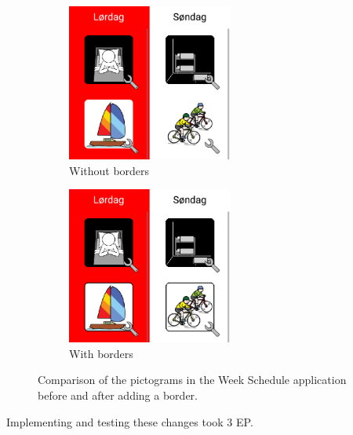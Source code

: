 \begin{figure}[h]
    \centering
        \begin{subfigure}[t]{0.5\textwidth}
        \centering
        \includegraphics[width=0.6\textwidth]{figures/img/screenshots/old_week_schedule_no_borders.png}
        \caption{Without borders}
    \end{subfigure}\hfill
        \begin{subfigure}[t]{0.5\textwidth}
        \centering
        \includegraphics[width=0.6\textwidth]{figures/img/screenshots/new_week_schedule_with_borders.png}
        \caption{With borders}
    \end{subfigure}
    \caption{Comparison of the pictograms in the Week Schedule application before and after adding a border.}
    \label{fig:before-after-borders}
\end{figure}

Implementing and testing these changes took 3 EP. 
